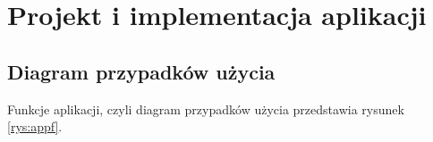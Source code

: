 \section{Projekt i implementacja aplikacji}

\subsection{Diagram przypadków użycia}

Funkcje aplikacji, czyli diagram przypadków użycia przedstawia rysunek \ref{rys:appf}. 


